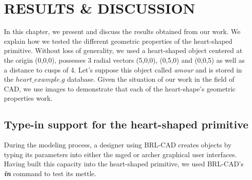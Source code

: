 \chapter{RESULTS \& DISCUSSION}
\label{Results \& Discussion}

\hspace{30} In   this   chapter,   we   present   and   discuss   the   results   obtained   from   our  
work.   We   explain   how   we   tested   the   different   geometric   properties   of   the  
heart­-shaped   primitive.   Without   loss   of   generality,   we   used   a   heart-­shaped  
object   centered   at   the   origin   (0,0,0), possesses   3   radial   vectors (5,0,0), (0,5,0) 
and (0,0,5) as   well   as   a   distance   to   cusps   of   4.   Let's   suppose   this  
object   called   \emph{amour}   and   is   stored   in   the   $heart\_example.g$   database. 
Given the situation of our work in the field of CAD, we   use   images   to   demonstrate   that 
  each   of   the   heart­-shape's   geometric  properties work.  


\section{Type-in support for the heart­-shaped primitive}

\hspace{30} During   the   modeling   process,   a   designer   using   BRL­-CAD   creates objects   by   typing   
its   parameters   into   either   the   mged   or   archer   graphical   user  interfaces.   
Having   built   this   capacity   into   the   heart-­shaped   primitive,   we   used  
BRL-­CAD's \textbf{\textit{in}} \cite{37} command to test its mettle.  

